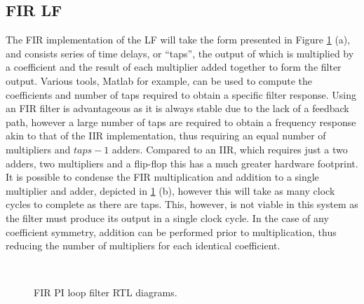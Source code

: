 \subsection{\acs{FIR} \acl{LF}}
The \acl{FIR} implementation of the \acl{LF} will take the form presented in Figure \ref{fig:fir_pi} (a), and consists series of time delays, or ``taps'', the output of which is multiplied by a coefficient and the result of each multiplier added together to form the filter output. Various tools, Matlab for example, can be used to compute the coefficients and number of taps required to obtain a specific filter response. Using an \ac{FIR} filter is advantageous as it is always stable due to the lack of a feedback path, however a large number of taps are required to obtain a frequency response akin to that of the \ac{IIR} implementation, thus requiring an equal number of multipliers and $taps-1$ adders. Compared to an \ac{IIR}, which requires just a two adders, two multipliers and a flip-flop this has a much greater hardware footprint. It is possible to condense the \ac{FIR} multiplication and addition to a single multiplier and adder, depicted in \ref{fig:fir_pi} (b), however this will take as many clock cycles to complete as there are taps. This, however, is not viable in this system as the filter must produce its output in a single clock cycle. In the case of any coefficient symmetry, addition can be performed prior to multiplication, thus reducing the number of multipliers for each identical coefficient.
\begin{figure}[h]
	\centering
	\\
	\caption[\ac{FIR} \ac{PI} loop filter RTL diagrams]{\ac{FIR} \ac{PI} loop filter RTL diagrams.}
	\label{fig:fir_pi}
\end{figure}

